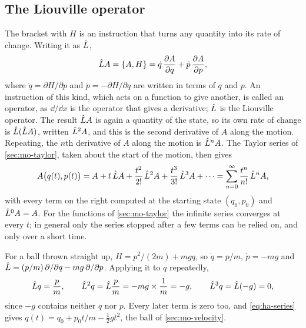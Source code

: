 \subsection*{The Liouville operator}

The bracket with $H$ is an instruction that turns any quantity into its
rate of change. Writing it as $\hat{L}$,
\begin{equation*}
   \hat{L} A = \{A, H\}
   = \dot{q}\,\frac{\partial A}{\partial q}
   + \dot{p}\,\frac{\partial A}{\partial p} ,
\end{equation*}
where $\dot{q} = \partial H/\partial p$ and $\dot{p} = -\partial H/
\partial q$ are written in terms of $q$ and $p$. An instruction of this
kind, which acts on a function to give another, is called an operator,
as $\dd/\dd x$ is the operator that gives a derivative; $\hat{L}$ is the
Liouville operator. The result $\hat{L} A$ is again a quantity of the
state, so its own rate of change is $\hat{L}(\hat{L} A)$, written $\hat{L}^2A$,
and this is the second derivative of $A$ along the motion. Repeating,
the $n$th derivative of $A$ along the motion is $\hat{L}^nA$. The Taylor
series of \cref{sec:mo-taylor}, taken about the start of the motion,
then gives
\begin{equation}
      A\bigl(q(t), p(t)\bigr) = A + t\,\hat{L} A + \frac{t^2}{2!}\,\hat{L}^2A
   + \frac{t^3}{3!}\,\hat{L}^3A + \dotsb
   = \sum_{n=0}^{\infty}\frac{t^n}{n!}\,\hat{L}^nA ,
   \label{eq:ha-series}
\end{equation}
with every term on the right computed at the starting state $(q_0, p_0)$
and $\hat{L}^0A = A$. For the functions of \cref{sec:mo-taylor} the infinite
series converges at every $t$; in general only the series stopped after a
few terms can be relied on, and only over a short time.

For a ball thrown straight up, $H = p^2/(2m) + mgq$, so $\dot{q} = p/m$,
$\dot{p} = -mg$ and $\hat{L} = (p/m)\,\partial/\partial q - mg\,\partial/
\partial p$. Applying it to $q$ repeatedly,
\begin{equation*}
   \hat{L} q = \frac{p}{m} , \qquad
   \hat{L}^2q = \hat{L}\frac{p}{m} = -mg\times\frac{1}{m} = -g , \qquad
   \hat{L}^3q = \hat{L}(-g) = 0 ,
\end{equation*}
since $-g$ contains neither $q$ nor $p$. Every later term is zero too, and
\cref{eq:ha-series} gives $q(t) = q_0 + p_0t/m - \frac12 gt^2$, the ball
of \cref{sec:mo-velocity}.

